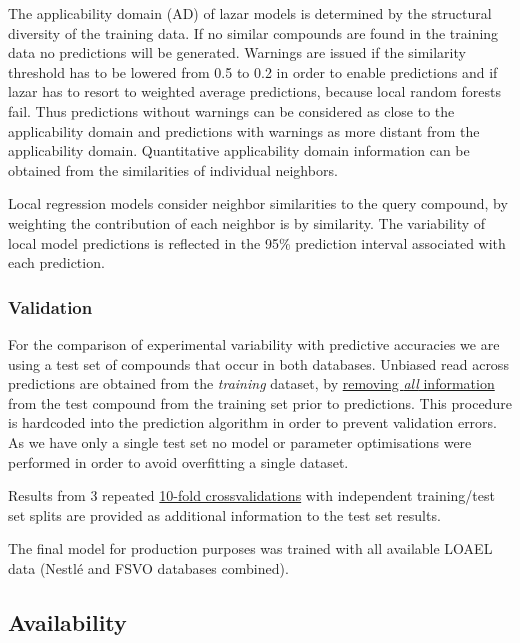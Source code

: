 \documentclass[]{achemso}
\begin{document}
The applicability domain (AD) of lazar models is determined by the
structural diversity of the training data. If no similar compounds are
found in the training data no predictions will be generated. Warnings
are issued if the similarity threshold has to be lowered from 0.5 to 0.2
in order to enable predictions and if lazar has to resort to weighted
average predictions, because local random forests fail. Thus predictions
without warnings can be considered as close to the applicability domain
and predictions with warnings as more distant from the applicability
domain. Quantitative applicability domain information can be obtained
from the similarities of individual neighbors.

Local regression models consider neighbor similarities to the query
compound, by weighting the contribution of each neighbor is by
similarity. The variability of local model predictions is reflected in
the 95\% prediction interval associated with each prediction.

\subsubsection{Validation}\label{validation}

For the comparison of experimental variability with predictive
accuracies we are using a test set of compounds that occur in both
databases. Unbiased read across predictions are obtained from the
\emph{training} dataset, by
\href{https://github.com/opentox/lazar/blob/loael-paper.revision/lib/model.rb\#L234-L238}{removing
\emph{all} information} from the test compound from the training set
prior to predictions. This procedure is hardcoded into the prediction
algorithm in order to prevent validation errors. As we have only a
single test set no model or parameter optimisations were performed in
order to avoid overfitting a single dataset.

Results from 3 repeated
\href{https://github.com/opentox/lazar/blob/loael-paper.revision/lib/crossvalidation.rb\#L85-L93}{10-fold
crossvalidations} with independent training/test set splits are provided
as additional information to the test set results.

The final model for production purposes was trained with all available
LOAEL data (Nestlé and FSVO databases combined).

\subsection{Availability}\label{availability}
\end{document}
